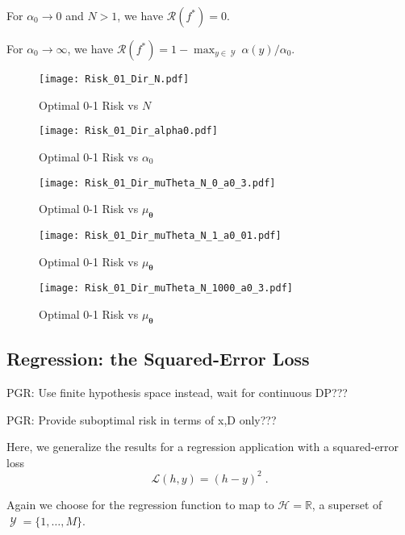 \documentclass[12pt]{report}
\DeclareMathOperator{\Ycal}{\mathcal{Y}}
\begin{document}
For $\alpha_0 \to 0$ and $N > 1$, we have $\mathcal{R}(f^*) = 0$.

For $\alpha_0 \to \infty$, we have $\mathcal{R}(f^*) = 1 - \max_{y \in \Ycal} \alpha(y) / \alpha_0$.



\begin{figure}
\centering
\texttt{[image: Risk\_01\_Dir\_N.pdf]}
\caption{Optimal 0-1 Risk vs $N$}
\label{fig:Risk_01_Dir_N}
\end{figure}

\begin{figure}
\centering
\texttt{[image: Risk\_01\_Dir\_alpha0.pdf]}
\caption{Optimal 0-1 Risk vs $\alpha_0$}
\label{fig:Risk_01_Dir_alpha0}
\end{figure}

\begin{figure}
\centering
\texttt{[image: Risk\_01\_Dir\_muTheta\_N\_0\_a0\_3.pdf]}
\caption{Optimal 0-1 Risk vs $\mu_{\bm{\theta}}$}
\label{fig:Risk_01_Dir_muTheta_N_0_a0_3}
\end{figure}

\begin{figure}
\centering
\texttt{[image: Risk\_01\_Dir\_muTheta\_N\_1\_a0\_01.pdf]}
\caption{Optimal 0-1 Risk vs $\mu_{\bm{\theta}}$}
\label{fig:Risk_01_Dir_muTheta_N_1_a0_01}
\end{figure}

\begin{figure}
\centering
\texttt{[image: Risk\_01\_Dir\_muTheta\_N\_1000\_a0\_3.pdf]}
\caption{Optimal 0-1 Risk vs $\mu_{\bm{\theta}}$}
\label{fig:Risk_01_Dir_muTheta_N_1000_a0_3}
\end{figure}





\subsection{Regression: the Squared-Error Loss}

PGR: Use finite hypothesis space instead, wait for continuous DP???

PGR: Provide suboptimal risk in terms of x,D only???


Here, we generalize the results for a regression application with a squared-error loss
\begin{equation}
\mathcal{L}(h,y) = (h-y)^2 \;.
\end{equation}

Again we choose for the regression function to map to $\mathcal{H} = \mathbb{R}$, a superset of $\Ycal = \{1,\ldots,M\}$.
\end{document}
